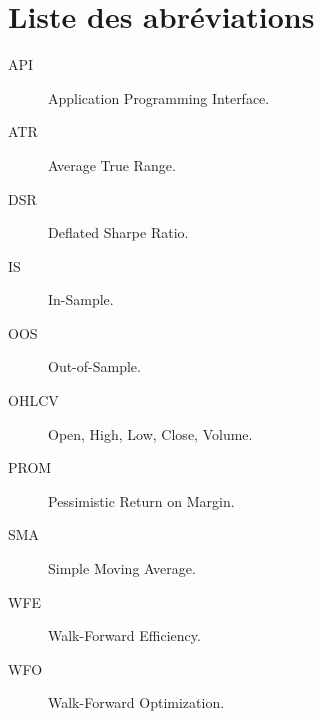 ﻿\chapter*{Liste des abréviations}

\begin{description}
\item[API] Application Programming Interface.
\item[ATR] Average True Range.
\item[DSR] Deflated Sharpe Ratio.
\item[IS] In-Sample.
\item[OOS] Out-of-Sample.
\item[OHLCV] Open, High, Low, Close, Volume.
\item[PROM] Pessimistic Return on Margin.
\item[SMA] Simple Moving Average.
\item[WFE] Walk-Forward Efficiency.
\item[WFO] Walk-Forward Optimization.
\end{description}
